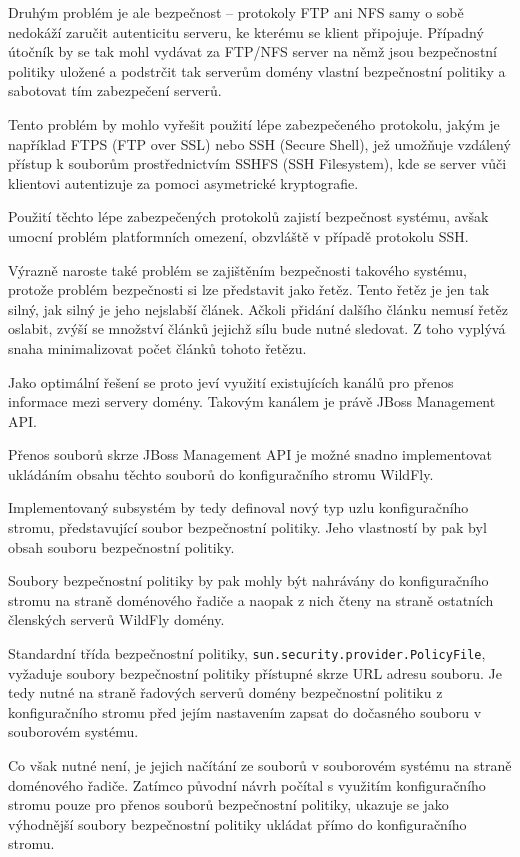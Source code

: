 Druhým problém je ale bezpečnost -- protokoly FTP ani NFS samy o sobě nedokáží zaručit autenticitu serveru, ke kterému se klient připojuje.
Případný útočník by se tak mohl vydávat za FTP/NFS server na němž jsou bezpečnostní politiky uložené a podstrčit tak serverům domény vlastní bezpečnostní politiky a sabotovat tím zabezpečení serverů.

Tento problém by mohlo vyřešit použití lépe zabezpečeného protokolu, jakým je například FTPS (FTP over SSL) nebo SSH (Secure Shell), jež umožňuje vzdálený přístup k souborům prostřednictvím SSHFS (SSH Filesystem), kde se server vůči klientovi autentizuje za pomoci asymetrické kryptografie. \cite[3]{ssh}

Použití těchto lépe zabezpečených protokolů zajistí bezpečnost systému, avšak umocní problém platformních omezení, obzvláště v případě protokolu SSH.

Výrazně naroste také problém se zajištěním bezpečnosti takového systému, protože problém bezpečnosti si lze představit jako řetěz.
Tento řetěz je jen tak silný, jak silný je jeho nejslabší článek.
Ačkoli přidání dalšího článku nemusí řetěz oslabit, zvýší se množství článků jejichž sílu bude nutné sledovat.
Z toho vyplývá snaha minimalizovat počet článků tohoto řetězu.

Jako optimální řešení se proto jeví využití existujících kanálů pro přenos informace mezi servery domény.
Takovým kanálem je právě JBoss Management API.

Přenos souborů skrze JBoss Management API je možné snadno implementovat ukládáním obsahu těchto souborů do konfiguračního stromu WildFly.

Implementovaný subsystém by tedy definoval nový typ uzlu konfiguračního stromu, představující soubor bezpečnostní politiky. Jeho vlastností by pak byl obsah souboru bezpečnostní politiky.

Soubory bezpečnostní politiky by pak mohly být nahrávány do konfiguračního stromu na straně doménového řadiče a naopak z nich čteny na straně ostatních členských serverů WildFly domény.

Standardní třída bezpečnostní politiky, {\tt sun.security.provider.PolicyFile}, vyžaduje soubory bezpečnostní politiky přístupné skrze URL adresu souboru.
Je tedy nutné na straně řadových serverů domény bezpečnostní politiku z konfiguračního stromu před jejím nastavením zapsat do dočasného souboru v souborovém systému.

Co však nutné není, je jejich načítání ze souborů v souborovém systému na straně doménového řadiče. Zatímco původní návrh počítal s využitím konfiguračního stromu pouze pro přenos souborů bezpečnostní politiky, ukazuje se jako výhodnější soubory bezpečnostní politiky ukládat přímo do konfiguračního stromu.

